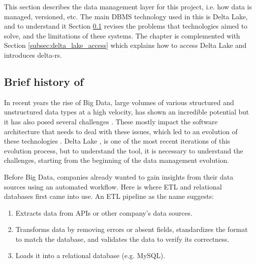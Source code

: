 This section describes the data management layer for this project, i.e. how data is managed, versioned, etc. The main \gls{DBMS} technology used in this is Delta Lake, and to understand it Section \ref{subsec:history_DBMS} revises the problems that technologies aimed to solve, and the limitations of these systems. The chapter is complemented with Section \ref{subsec:delta_lake_access} which explains how to access Delta Lake and introduces delta-rs.

\subsection{Brief history of }
\label{subsec:history_DBMS}

In recent years the rise of Big Data, large volumes of various structured and unstructured data types at a high velocity, has shown an incredible potential but it has also posed several challenges \cite{penceWhatBigData2014}. These mostly impact the software architecture that needs to deal with these issues, which led to an evolution of these technologies \cite{gortonDistributionDataDeployment2015}. Delta Lake \cite{armbrustDeltaLakeHighperformance2020}, is one of the most recent iterations of this evolution process, but to understand the tool, it is necessary to understand the challenges, starting from the beginning of the data management evolution.

Before Big Data, companies already wanted to gain insights from their data sources using an automated workflow. Here is where \gls{ETL} and relational databases first came into use. An \gls{ETL} pipeline as the name suggests:
\begin{enumerate}
    \item Extracts data from \glspl{API} or other company's data sources.
    \item Transforms data by removing errors or absent fields, standardizes the format to match the database, and validates the data to verify its correctness.
    \item Loads it into a relational database (e.g. MySQL).
\end{enumerate} 

